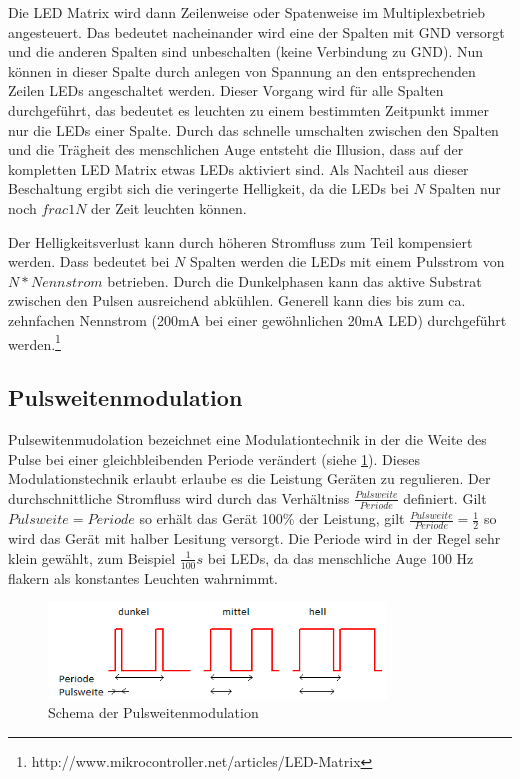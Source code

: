 Die LED Matrix
wird dann Zeilenweise oder Spatenweise im Multiplexbetrieb angesteuert. Das bedeutet nacheinander wird eine der Spalten mit GND versorgt und die anderen Spalten sind unbeschalten (keine Verbindung zu GND). Nun können in dieser Spalte durch anlegen von Spannung an den entsprechenden Zeilen LEDs angeschaltet werden. 
Dieser Vorgang wird für alle Spalten durchgeführt, das bedeutet es leuchten zu
einem bestimmten Zeitpunkt immer nur die LEDs einer Spalte. Durch das schnelle
umschalten zwischen den Spalten und die Trägheit des menschlichen Auge entsteht
die Illusion, dass auf der kompletten LED Matrix etwas LEDs aktiviert sind.
Als Nachteil aus dieser Beschaltung ergibt sich die veringerte Helligkeit, da
die LEDs bei $N$ Spalten nur noch $frac{1}{N}$ der Zeit leuchten können.

Der Helligkeitsverlust kann durch höheren Stromfluss zum Teil kompensiert
werden. Dass bedeutet bei $N$ Spalten werden die LEDs mit einem Pulsstrom von
$N*Nennstrom$ betrieben. Durch die Dunkelphasen kann das aktive Substrat
zwischen den Pulsen ausreichend abkühlen. Generell kann dies bis zum ca.
zehnfachen Nennstrom (200mA bei einer gewöhnlichen 20mA LED) durchgeführt
werden.\footnote{http://www.mikrocontroller.net/articles/LED-Matrix}

\subsection{Pulsweitenmodulation}\label{sec_pulsweitenmodulation}
Pulsewitenmudolation bezeichnet eine Modulationtechnik in der die Weite des
Pulse bei einer gleichbleibenden Periode verändert (siehe \ref{pwm_schma}).
Dieses Modulationstechnik erlaubt erlaube es die Leistung Geräten zu regulieren.
Der durchschnittliche Stromfluss wird durch das Verhältniss
$\frac{Pulsweite}{Periode}$ definiert. Gilt $Pulsweite=Periode$ so erhält das
Gerät 100\% der Leistung, gilt $\frac{Pulsweite}{Periode}=\frac{1}{2}$ so wird das Gerät mit halber Lesitung
versorgt.
Die Periode wird in der Regel sehr klein gewählt, zum Beispiel $\frac{1}{100}s$
bei LEDs, da das menschliche Auge 100 Hz flakern als konstantes Leuchten
wahrnimmt.
\begin{figure}[h]
  \begin{center}
    \includegraphics[width=0.8\textwidth]{skizzen/pwm.png}
  \end{center}
  \caption{Schema der Pulsweitenmodulation}
  \label{pwm_schma}
\end{figure}



